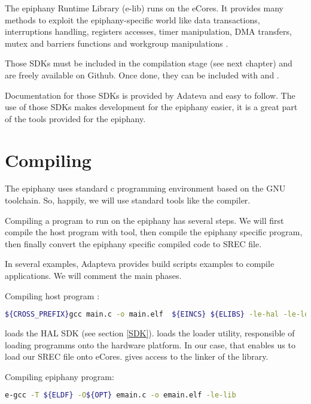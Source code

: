 The \gls{epiphany} Runtime Library (e-lib) runs on the \glspl{eCore}. It provides many methods to exploit the \gls{epiphany}-specific world like data transactions, interruptions handling, registers accesses, timer manipulation, \gls{DMA} transfers, mutex and barriers functions and workgroup manipulations \cite{epiphanySDK}.

Those \glspl{SDK} must be included in the compilation stage (see next chapter) and are freely available on Github\cite{githubadapteva}. Once done, they can be included with  and .

Documentation for those \glspl{SDK} is provided by Adateva and easy to follow. The use of those \glspl{SDK} makes development for the \gls{epiphany} easier, it is a great part of the tools provided for the \gls{epiphany}.

\section{Compiling}

The \gls{epiphany} uses standard c programming environment based on the GNU toolchain\cite{kickstarting}. So, happily, we will use standard tools like the  compiler.

Compiling a program to run on the \gls{epiphany} has several steps. We will first compile the host program with  tool, then compile the \gls{epiphany} specific program, then finally convert the \gls{epiphany} specific compiled code to \gls{SREC} file.

In several examples, Adapteva provides build scripts examples to compile applications. We will comment the main phases.

Compiling host program :

\begin{lstlisting}[language=bash]
${CROSS_PREFIX}gcc main.c -o main.elf  ${EINCS} ${ELIBS} -le-hal -le-loader -lpthread}
\end{lstlisting}

 loads the HAL SDK (see section \ref{SDK}).  loads the loader utility, responsible of loading programms onto the hardware platform\cite{epiphanySDK}. In our case, that enables us to load our \gls{SREC} file onto \glspl{eCore}.  gives access to the linker of the  library.

Compiling \gls{epiphany} program:

\begin{lstlisting}[language=bash]
e-gcc -T ${ELDF} -O${OPT} emain.c -o emain.elf -le-lib
\end{lstlisting}

